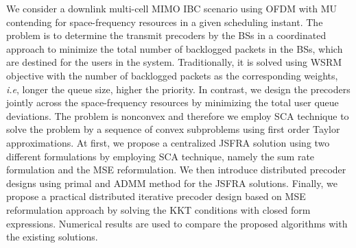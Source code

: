 We consider a downlink multi-cell \ac{MIMO} \ac{IBC} scenario using \ac{OFDM} with \acl{MU} contending for space-frequency resources in a given scheduling instant. The problem is to determine the transmit precoders by the \acp{BS} in a coordinated approach to minimize the total number of backlogged packets in the \acp{BS}, which are destined for the users in the system. Traditionally, it is solved using \ac{WSRM} objective with the number of backlogged packets as the corresponding weights, \textit{i.e}, longer the queue size, higher the priority. In contrast, we design the precoders jointly across the space-frequency resources by minimizing the total user queue deviations. The problem is nonconvex and therefore we employ \ac{SCA} technique to solve the problem by a sequence of convex subproblems using first order Taylor approximations. At first, we propose a centralized \ac{JSFRA} solution using two different formulations by employing \ac{SCA} technique, namely the sum rate formulation and the \ac{MSE} reformulation. We then introduce distributed precoder designs using primal and \acl{ADMM} method for the \ac{JSFRA} solutions. Finally, we propose a practical distributed iterative precoder design based on \ac{MSE} reformulation approach by solving the \acl{KKT} conditions with closed form expressions. Numerical results are used to compare the proposed algorithms with the existing solutions.



